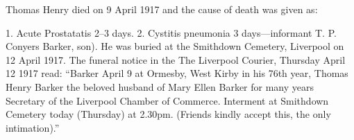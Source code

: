 Thomas Henry died on 9 April 1917\cite{THBdeathcert} and the cause of death was given as:

 1. Acute Prostatatis 2--3 days. 2. Cystitis pneumonia 3 days---informant T. P. Conyers Barker, son).  He was buried at the Smithdown Cemetery, Liverpool on 12 April 1917.\cite{ToxtethBarker20} The funeral notice in the The Liverpool Courier, Thursday April 12 1917 read:
``Barker April 9 at Ormesby, West Kirby in his 76th year, Thomas Henry Barker the beloved husband of Mary Ellen Barker for many years Secretary of the Liverpool Chamber of Commerce. Interment at Smithdown Cemetery today (Thursday) at 2.30pm. (Friends kindly accept this, the only intimation).''
